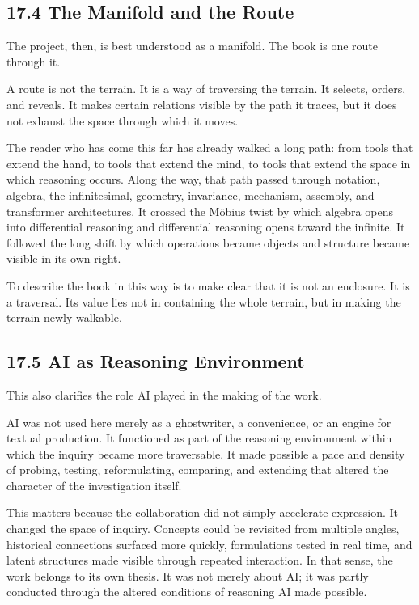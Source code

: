 \documentclass[
]{article}
\begin{document}
\hypertarget{the-manifold-and-the-route}{%
\subsection{17.4 The Manifold and the
Route}\label{the-manifold-and-the-route}}

The project, then, is best understood as a manifold. The book is one
route through it.

A route is not the terrain. It is a way of traversing the terrain. It
selects, orders, and reveals. It makes certain relations visible by the
path it traces, but it does not exhaust the space through which it
moves.

The reader who has come this far has already walked a long path: from
tools that extend the hand, to tools that extend the mind, to tools that
extend the space in which reasoning occurs. Along the way, that path
passed through notation, algebra, the infinitesimal, geometry,
invariance, mechanism, assembly, and transformer architectures. It
crossed the Möbius twist by which algebra opens into differential
reasoning and differential reasoning opens toward the infinite. It
followed the long shift by which operations became objects and structure
became visible in its own right.

To describe the book in this way is to make clear that it is not an
enclosure. It is a traversal. Its value lies not in containing the whole
terrain, but in making the terrain newly walkable.

\hypertarget{ai-as-reasoning-environment}{%
\subsection{17.5 AI as Reasoning
Environment}\label{ai-as-reasoning-environment}}

This also clarifies the role AI played in the making of the work.

AI was not used here merely as a ghostwriter, a convenience, or an
engine for textual production. It functioned as part of the reasoning
environment within which the inquiry became more traversable. It made
possible a pace and density of probing, testing, reformulating,
comparing, and extending that altered the character of the investigation
itself.

This matters because the collaboration did not simply accelerate
expression. It changed the space of inquiry. Concepts could be revisited
from multiple angles, historical connections surfaced more quickly,
formulations tested in real time, and latent structures made visible
through repeated interaction. In that sense, the work belongs to its own
thesis. It was not merely about AI; it was partly conducted through the
altered conditions of reasoning AI made possible.
\end{document}
